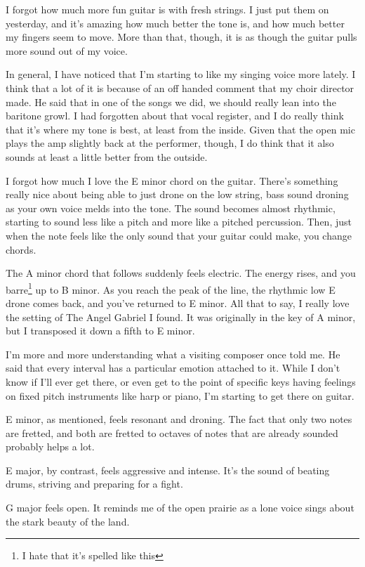 \documentclass[12pt]{article}[titlepage]
\newcommand{\1}{\={a}}
\newcommand{\2}{\={e}}
\newcommand{\3}{\={\i}}
\newcommand{\4}{\=o}
\newcommand{\5}{\=u}
\newcommand{\6}{\={A}}
\renewcommand{\,}{\textsuperscript{,}}
\begin{document}
I forgot how much more fun guitar is with fresh strings.
I just put them on yesterday, and it's amazing how much better the tone is, and how much better my fingers seem to move.
More than that, though, it is as though the guitar pulls more sound out of my voice.

In general, I have noticed that I'm starting to like my singing voice more lately.
I think that a lot of it is because of an off handed comment that my choir director made.
He said that in one of the songs we did, we should really lean into the baritone growl.
I had forgotten about that vocal register, and I do really think that it's where my tone is best, at least from the inside.
Given that the open mic plays the amp slightly back at the performer, though, I do think that it also sounds at least a little better from the outside.

I forgot how much I love the E minor chord on the guitar.
There's something really nice about being able to just drone on the low string, bass sound droning as your own voice melds into the tone.
The sound becomes almost rhythmic, starting to sound less like a pitch and more like a pitched percussion.
Then, just when the note feels like the only sound that your guitar could make, you change chords.

The A minor chord that follows suddenly feels electric.
The energy rises, and you barre\footnote{I hate that it's spelled like this} up to B minor.
As you reach the peak of the line, the rhythmic low E drone comes back, and you've returned to E minor.
All that to say, I really love the setting of The Angel Gabriel I found.
It was originally in the key of A minor, but I transposed it down a fifth to E minor.

I'm more and more understanding what a visiting composer once told me.
He said that every interval has a particular emotion attached to it.
While I don't know if I'll ever get there, or even get to the point of specific keys having feelings on fixed pitch instruments like harp or piano, I'm starting to get there on guitar.

E minor, as mentioned, feels resonant and droning.
The fact that only two notes are fretted, and both are fretted to octaves of notes that are already sounded probably helps a lot.

E major, by contrast, feels aggressive and intense.
It's the sound of beating drums, striving and preparing for a fight.

G major feels open.
It reminds me of the open prairie as a lone voice sings about the stark beauty of the land.
\end{document}
